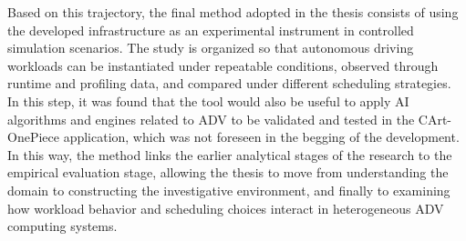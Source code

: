 Based on this trajectory, the final method adopted in the thesis consists of using the developed infrastructure as an experimental instrument in controlled simulation scenarios. The study is organized so that autonomous driving workloads can be instantiated under repeatable conditions, observed through runtime and profiling data, and compared under different scheduling strategies. In this step, it was found that the tool would also be useful to apply AI algorithms and engines related to ADV to be validated and tested in the CArt-OnePiece application, which was not foreseen in the begging of the development. In this way, the method links the earlier analytical stages of the research to the empirical evaluation stage, allowing the thesis to move from understanding the domain to constructing the investigative environment, and finally to examining how workload behavior and scheduling choices interact in heterogeneous ADV computing systems.
